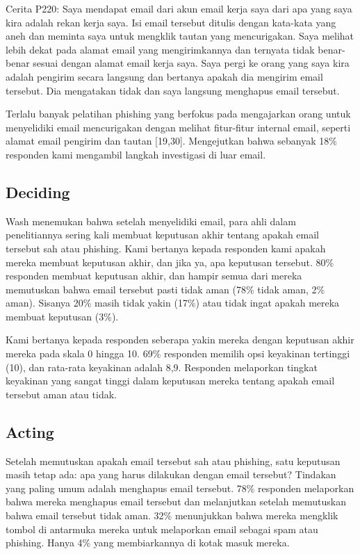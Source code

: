 \documentclass[lettersize,journal]{IEEEtran}
\begin{document}
Cerita P220: Saya mendapat email dari akun email kerja saya dari apa yang saya
kira adalah rekan kerja saya. Isi email tersebut ditulis dengan kata-kata yang
aneh dan meminta saya untuk mengklik tautan yang mencurigakan. Saya melihat
lebih dekat pada alamat email yang mengirimkannya dan ternyata tidak
benar-benar sesuai dengan alamat email kerja saya. Saya pergi ke orang yang
saya kira adalah pengirim secara langsung dan bertanya apakah dia mengirim
email tersebut. Dia mengatakan tidak dan saya langsung menghapus email
tersebut.

Terlalu banyak pelatihan phishing yang berfokus pada mengajarkan orang untuk
menyelidiki email mencurigakan dengan melihat fitur-fitur internal email,
seperti alamat email pengirim dan tautan [19,30]. Mengejutkan bahwa sebanyak
18\% responden kami mengambil langkah investigasi di luar email.

\subsection{Deciding}

Wash \cite{tigaempat} menemukan bahwa setelah menyelidiki email, para ahli
dalam penelitiannya sering kali membuat keputusan akhir tentang apakah email
tersebut sah atau phishing. Kami bertanya kepada responden kami apakah mereka
membuat keputusan akhir, dan jika ya, apa keputusan tersebut. 80\% responden
membuat keputusan akhir, dan hampir semua dari mereka memutuskan bahwa email
tersebut pasti tidak aman (78\% tidak aman, 2\% aman). Sisanya 20\% masih tidak
yakin (17\%) atau tidak ingat apakah mereka membuat keputusan (3\%).

Kami bertanya kepada responden seberapa yakin mereka dengan keputusan akhir
mereka pada skala 0 hingga 10. 69\% responden memilih opsi keyakinan tertinggi
(10), dan rata-rata keyakinan adalah 8,9. Responden melaporkan tingkat
keyakinan yang sangat tinggi dalam keputusan mereka tentang apakah email
tersebut aman atau tidak.

\subsection{Acting}

Setelah memutuskan apakah email tersebut sah atau phishing, satu keputusan
masih tetap ada: apa yang harus dilakukan dengan email tersebut? Tindakan yang
paling umum adalah menghapus email tersebut. 78\% responden melaporkan bahwa
mereka menghapus email tersebut dan melanjutkan setelah memutuskan bahwa email
tersebut tidak aman. 32\% menunjukkan bahwa mereka mengklik tombol di antarmuka
mereka untuk melaporkan email sebagai spam atau phishing. Hanya 4\% yang
membiarkannya di kotak masuk mereka.
\end{document}
